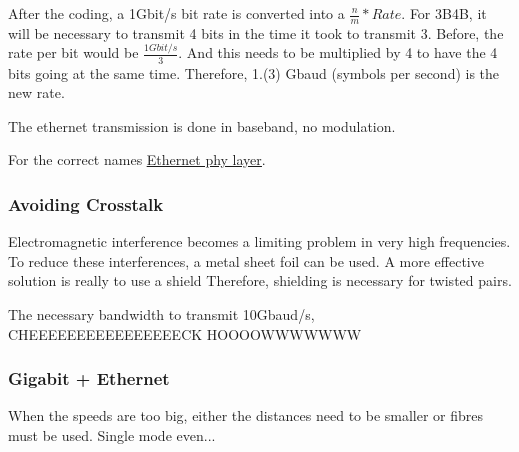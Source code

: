 After the coding, a 1Gbit/s bit rate is converted into a $\frac{n}{m} * Rate$. For 3B4B, it will be necessary to transmit 4 bits in the time it took to transmit 3. Before, the rate per bit would be $\frac{1Gbit/s}{3}$. And this needs to be multiplied by 4 to have the 4 bits going at the same time. Therefore, 1.(3) Gbaud (symbols per second) is the new rate.



The ethernet transmission is done in baseband, no modulation.


For the correct names \href{https://en.wikipedia.org/wiki/Ethernet_physical_layer}{\ul{Ethernet phy layer}}.


\subsubsection*{Avoiding Crosstalk}
Electromagnetic interference becomes a limiting problem in very high frequencies.
To reduce these interferences, a metal sheet foil can be used. A more effective solution is really to use a shield 
Therefore, shielding is necessary for twisted pairs.


The necessary bandwidth to transmit 10Gbaud/s, CHEEEEEEEEEEEEEEEECK HOOOOWWWWWWW


\subsubsection*{Gigabit + Ethernet}
When the speeds are too big, either the distances need to be smaller or fibres must be used. Single mode even...
